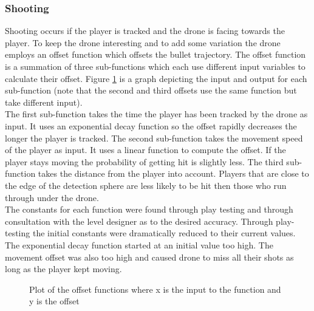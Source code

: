 \documentclass[11pt,a4paper]{article}
\begin{document}
\subsubsection{Shooting}
Shooting occurs if the player is tracked and the drone is facing towards the player. To keep the drone interesting and to add some variation the drone employs an offset function which offsets the bullet trajectory. The offset function is a summation of three sub-functions which each use different input variables to calculate their offset. Figure \ref{fig:offset} is a graph depicting the input and output for each sub-function (note that the second and third offsets use the same function but take different input).\smallskip\\
The first sub-function takes the time the player has been tracked by the drone as input. It uses an exponential decay function so the offset rapidly decreases the longer the player is tracked. The second sub-function takes the movement speed of the player as input. It uses a linear function to compute the offset. If the player stays moving the probability of getting hit is slightly less. The third sub-function takes the distance from the player into account. Players that are close to the edge of the detection sphere are less likely to be hit then those who run through under the drone.\smallskip\\ 
The constants for each function were found through play testing and through consultation with the level designer as to the desired accuracy. Through play-testing the initial constants were dramatically reduced to their current values. The exponential decay function started at an initial value too high. The movement offset was also too high and caused drone to miss all their shots as long as the player kept moving. 
\begin{figure}[H]
    \caption{Plot of the offset functions where x is the input to the function and y is the offset}
    \label{fig:offset}
\end{figure}
\end{document}
